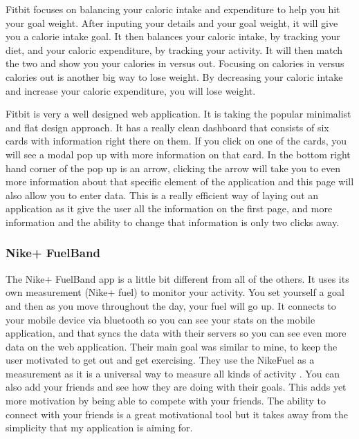 Fitbit focuses on balancing your caloric intake and expenditure to help you hit your goal weight. After inputing your details and your goal weight, it will give you a calorie intake goal. It then balances your caloric intake, by tracking your diet, and your caloric expenditure, by tracking your activity. It will then match the two and show you your calories in versus out. Focusing on calories in versus calories out is another big way to lose weight. By decreasing your caloric intake and increase your caloric expenditure, you will lose weight.

Fitbit is very a well designed web application. It is taking the popular minimalist and flat design approach. It has a really clean dashboard that consists of six cards with information right there on them. If you click on one of the cards, you will see a modal pop up with more information on that card. In the bottom right hand corner of the pop up is an arrow, clicking the arrow will take you to even more information about that specific element of the application and this page will also allow you to enter data. This is a really efficient way of laying out an application as it give the user all the information on the first page, and more information and the ability to change that information is only two clicks away.

\subsubsection{Nike+ FuelBand}
The Nike+ FuelBand app is a little bit different from all of the others. It uses its own measurement (Nike+ fuel) to monitor your activity. You set yourself a goal and then as you move throughout the day, your fuel will go up. It connects to your mobile device via bluetooth so you can see your stats on the mobile application, and that syncs the data with their servers so you can see even more data on the web application. Their main goal was similar to mine, to keep the user motivated to get out and get exercising. They use the NikeFuel as a measurement as it is a universal way to measure all kinds of activity \citep{fuelbandpress:2013}. You can also add your friends and see how they are doing with their goals. This adds yet more motivation by being able to compete with your friends. The ability to connect with your friends is a great motivational tool but it takes away from the simplicity that my application is aiming for.

